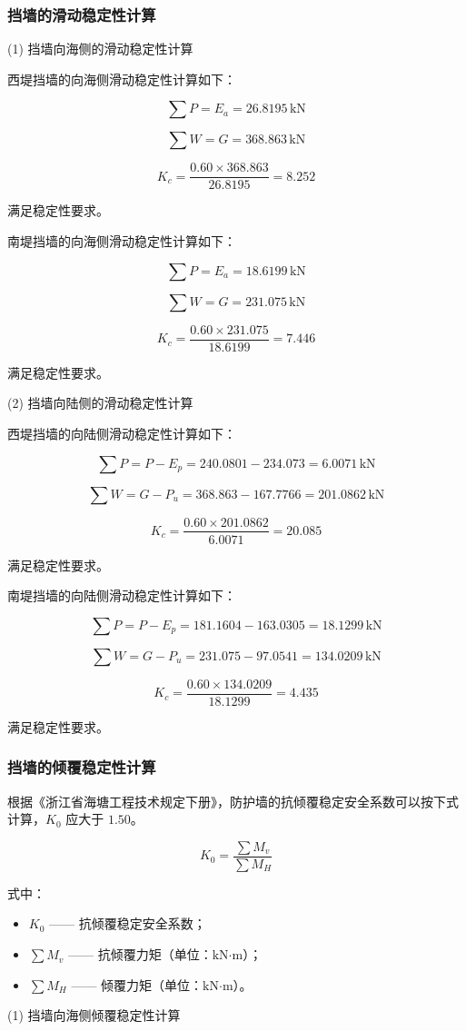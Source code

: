 \documentclass[UTF8, a4paper, 12pt]{ctexart} %
\begin{document}
\subsubsection{挡墙的滑动稳定性计算}

(1) 挡墙向海侧的滑动稳定性计算

西堤挡墙的向海侧滑动稳定性计算如下：

\[
\sum P = E_a = 26.8195\,\text{kN}
\]

\[
\sum W = G = 368.863\,\text{kN}
\]

\[
K_c = \frac{0.60 \times 368.863}{26.8195} = 8.252
\]

满足稳定性要求。

南堤挡墙的向海侧滑动稳定性计算如下：

\[
\sum P = E_a = 18.6199\,\text{kN}
\]

\[
\sum W = G = 231.075\,\text{kN}
\]

\[
K_c = \frac{0.60 \times 231.075}{18.6199} = 7.446
\]

满足稳定性要求。

(2) 挡墙向陆侧的滑动稳定性计算

西堤挡墙的向陆侧滑动稳定性计算如下：

\[
\sum P = P - E_p = 240.0801 - 234.073 = 6.0071\,\text{kN}
\]

\[
\sum W = G - P_u = 368.863 - 167.7766 = 201.0862\,\text{kN}
\]

\[
K_c = \frac{0.60 \times 201.0862}{6.0071} = 20.085
\]

满足稳定性要求。

南堤挡墙的向陆侧滑动稳定性计算如下：

\[
\sum P = P - E_p = 181.1604 - 163.0305 = 18.1299\,\text{kN}
\]

\[
\sum W = G - P_u = 231.075 - 97.0541 = 134.0209\,\text{kN}
\]

\[
K_c = \frac{0.60 \times 134.0209}{18.1299} = 4.435
\]

满足稳定性要求。
\subsubsection{挡墙的倾覆稳定性计算}
根据《浙江省海塘工程技术规定下册》，防护墙的抗倾覆稳定安全系数可以按下式计算，$K_0$ 应大于 $1.50$。

\[
K_0 = \frac{\sum M_v}{\sum M_H}
\]

式中：
\begin{itemize}
    \item $K_0$ —— 抗倾覆稳定安全系数；
    \item $\sum M_v$ —— 抗倾覆力矩（单位：$\text{kN·m}$）；
    \item $\sum M_H$ —— 倾覆力矩（单位：$\text{kN·m}$）。
\end{itemize}
(1) 挡墙向海侧倾覆稳定性计算
\end{document}
